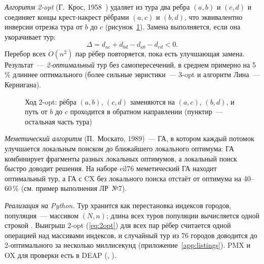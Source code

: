 \emph{Алгоритм 2-opt} (Г.~Крос, 1958~\cite{croes1958}) удаляет из тура два ребра $(a, b)$ и $(c, d)$ и
соединяет концы крест-накрест рёбрами $(a, c)$ и $(b, d)$, что эквивалентно инверсии отрезка тура от $b$
до $c$ (рисунок~\ref{fig:2opt}). Замена выполняется, если она укорачивает тур:
\begin{equation}
\label{eq:2opt}
\Delta = d_{ac} + d_{bd} - d_{ab} - d_{cd} < 0 .
\end{equation}
Перебор всех $O(n^2)$ пар рёбер повторяется, пока есть улучшающая замена. Результат~---
\emph{2-оптимальный} тур без самопересечений, в среднем примерно на 5\,\% длиннее оптимального (более
сильные эвристики~--- 3-opt и алгоритм Лина~--- Кернигана).

\begin{figure}[!htb]
\centering
{}
\caption{Ход 2-opt: рёбра $(a, b)$, $(c, d)$ заменяются на $(a, c)$, $(b, d)$, и путь от $b$ до $c$
проходится в обратном направлении (пунктир~--- остальная часть тура)}
\label{fig:2opt}
\end{figure}

\emph{Меметический алгоритм} (П.~Москато, 1989)~--- ГА, в котором каждый потомок улучшается локальным
поиском до ближайшего локального оптимума: ГА комбинирует фрагменты разных локальных оптимумов, а
локальный поиск быстро доводит решения. На наборе eil76 меметический ГА находит оптимальный тур, а
ГА с CX без локального поиска отстаёт от оптимума на 40--60\,\% (см. пример выполнения ЛР~№7).

\label{sec:py-tsp}\emph{Реализация на Python.} Тур хранится как перестановка индексов городов, популяция~--- массивом $(N, n)$; длина всех туров
популяции вычисляется одной строкой . Выигрыш 2-opt
(\ref{eq:2opt}) для всех пар рёбер считается одной операцией над массивами индексов, и случайный тур из
76 городов доводится до 2-оптимального за несколько миллисекунд (приложение~\ref{app:listings}).
PMX и OX для проверки есть в DEAP (, ).
